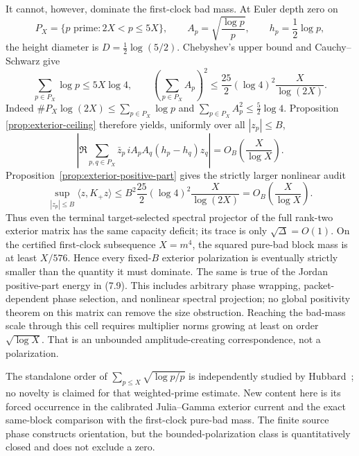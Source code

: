 \documentclass[11pt]{article}
\theoremstyle{definition}
\theoremstyle{remark}
\begin{document}
It cannot, however, dominate the first-clock bad mass.  At Euler depth zero on
\[
 P_X=\{p\text{ prime}:2X<p\leq5X\},\qquad
 A_p=\sqrt{\frac{\log p}{p}},\qquad h_p=\frac12\log p,
\]
the height diameter is $D=\frac12\log(5/2)$.  Chebyshev's upper bound and
Cauchy--Schwarz give
\[
 \sum_{p\in P_X}\log p\leq5X\log4,\qquad
 \left(\sum_{p\in P_X}A_p\right)^2
 \leq \frac{25}{2}(\log4)^2\frac{X}{\log(2X)}.
 \tag{7.7}
\]
Indeed $\#P_X\log(2X)\leq\sum_{p\in P_X}\log p$ and
$\sum_{p\in P_X}A_p^2\leq\frac52\log4$.  Proposition
\ref{prop:exterior-ceiling} therefore yields, uniformly over all $|z_p|\leq B$,
\[
 \left|\Re\sum_{p,q\in P_X}
 \bar z_p\,iA_pA_q(h_p-h_q)z_q\right|
 =O_B\!\left(\frac{X}{\log X}\right).
 \tag{7.8}
\]
Proposition~\ref{prop:exterior-positive-part} gives the strictly larger nonlinear audit
\[
 \sup_{|z_p|\leq B}\langle z,K_+z\rangle
 \leq
 B^2\frac{25}{2}(\log4)^2\frac{X}{\log(2X)}
 =O_B\!\left(\frac{X}{\log X}\right).
 \tag{7.9}
\]
Thus even the terminal target-selected spectral projector of the full rank-two exterior matrix
has the same capacity deficit; its trace is only $\sqrt\Delta=O(1)$.
On the certified first-clock subsequence $X=m^4$, the squared pure-bad block mass is at least
$X/576$.  Hence every fixed-$B$ exterior polarization is eventually strictly smaller than the
quantity it must dominate.  The same is true of the Jordan positive-part energy in (7.9).
This includes arbitrary phase wrapping, packet-dependent phase selection, and nonlinear spectral
projection; no global positivity theorem on this matrix can remove the size obstruction.
Reaching the bad-mass scale through this cell requires multiplier norms growing at least on order
$\sqrt{\log X}$.  That is an unbounded amplitude-creating correspondence, not a polarization.

The standalone order of $\sum_{p\leq X}\sqrt{\log p/p}$ is independently studied by
Hubbard~\cite{Hubbard2026}; no novelty is claimed for that weighted-prime estimate.  New content
here is its forced occurrence in the calibrated Julia--Gamma exterior current and the exact
same-block comparison with the first-clock pure-bad mass.  The finite source phase constructs
orientation, but the bounded-polarization class is quantitatively closed and does not exclude a
zero.
\end{document}
